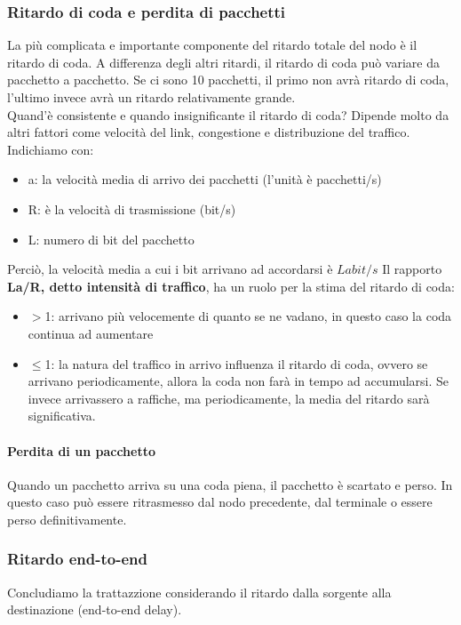 \documentclass[11pt,a4paper]{article}
\begin{document}
\subsubsection{Ritardo di coda e perdita di pacchetti}
La più complicata e importante componente del ritardo totale del nodo è il ritardo di coda. A differenza degli altri ritardi, il ritardo di coda può variare da pacchetto a pacchetto. Se ci sono 10 pacchetti, il primo non avrà ritardo di coda, l'ultimo invece avrà un ritardo relativamente grande. \\
Quand'è consistente e quando insignificante il ritardo di coda? Dipende molto da altri fattori come velocità del link, congestione e distribuzione del traffico.
Indichiamo con:
\begin{itemize}
	\item a: la velocità media di arrivo dei pacchetti (l'unità è pacchetti/s)
	\item R: è la velocità di trasmissione (bit/s)
	\item L: numero di bit del pacchetto
\end{itemize}	
Perciò, la velocità media a cui i bit arrivano ad accordarsi è $La bit/s$
Il rapporto \textbf{La/R, detto intensità di traffico}, ha un ruolo per la stima del ritardo di coda:
\begin{itemize}
	\item $>$1: arrivano più velocemente di quanto se ne vadano, in questo caso la coda continua ad aumentare
	\item $\leq$1: la natura del traffico in arrivo influenza il ritardo di coda, ovvero se arrivano 	periodicamente, allora la coda non farà in tempo ad accumularsi. Se invece arrivassero a raffiche, ma periodicamente, la media del ritardo sarà significativa.
\end{itemize}
\paragraph{Perdita di un pacchetto}
Quando un pacchetto arriva su una coda piena, il pacchetto è scartato e perso. In questo caso può essere ritrasmesso dal nodo precedente, dal terminale o essere perso definitivamente.

\subsubsection{Ritardo end-to-end}
Concludiamo la trattazzione considerando il ritardo dalla sorgente alla destinazione (end-to-end delay).
\end{document}
